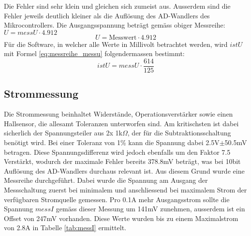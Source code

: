 Die Fehler sind sehr klein und gleichen sich zumeist aus. Ausserdem sind die Fehler jeweils deutlich kleiner als die Auflösung des AD-Wandlers des Mikrocontrollers. Die Ausgangsspannung beträgt gemäss obiger Messreihe: $U=messU\cdot 4.912$
\begin{equation}
	U=\text{Messwert}\cdot 4.912
\label{eq:messreihe_messu}
\end{equation}
Für die Software, in welcher alle Werte in Millivolt betrachtet werden, wird $istU$ mit Formel \ref{eq:messreihe_messu} folgendermassen bestimmt:
\begin{equation}
	istU=messU\cdot\frac{614}{125}
\label{eq:messreihe_messu_sw}
\end{equation}


\subsection{Strommessung}
Die Strommessung beinhaltet Widerstände, Operationsverstärker sowie einen Hallsensor, die allesamt Toleranzen unterworfen sind. Am kritischsten ist dabei sicherlich der Spannungsteiler aus 2x 1k$\Omega$, der für die Subtraktionsschaltung benötigt wird. Bei einer Toleranz von 1\% kann die Spannung dabei 2.5V$\pm$50.5mV betragen. Diese Spannungsdifferenz wird jedoch ebenfalls um den Faktor 7.5 Verstärkt, wodurch der maximale Fehler bereits 378.8mV beträgt, was bei 10bit Auflösung des AD-Wandlers durchaus relevant ist. \newline
Aus diesem Grund wurde eine Messreihe durchgeführt. Dabei wurde die Spannung am Ausgang der Messschaltung zuerst bei minimalem und anschliessend bei maximalem Strom der verfügbaren Stromquelle gemessen. Pro 0.1A mehr Ausgangsstrom sollte die Spannung $messI$ gemäss dieser Messung um 141mV zunehmen, ausserdem ist ein Offset von 247mV vorhanden. Diese Werte wurden bis zu einem Maximalstrom von 2.8A in Tabelle \ref{tab:messI} ermittelt.
